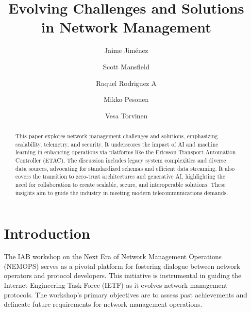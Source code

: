 \documentclass[11pt,sigconf]{iabart}
\begin{document}
\title{Evolving Challenges and Solutions in Network Management}

\author{Jaime Jiménez}

\author{Scott Mansfield}

\author{Raquel Rodriguez A}

\author{Mikko Pesonen}

\author{Vesa Torvinen}


\begin{abstract}

This paper explores network management challenges and solutions, emphasizing scalability, telemetry, and security. It underscores the impact of AI and machine learning in enhancing operations via platforms like the Ericsson Transport Automation Controller (ETAC). The discussion includes legacy system complexities and diverse data sources, advocating for standardized schemas and efficient data streaming. It also covers the transition to zero-trust architectures and generative AI, highlighting the need for collaboration to create scalable, secure, and interoperable solutions. These insights aim to guide the industry in meeting modern telecommunications demands.


\end{abstract}


\maketitle

\section{Introduction} \label{introduction}

The IAB workshop on the Next Era of Network Management Operations (NEMOPS) serves as a pivotal platform for fostering dialogue between network operators and protocol developers. This initiative is instrumental in guiding the Internet Engineering Task Force (IETF) as it evolves network management protocols. The workshop's primary objectives are to assess past achievements and delineate future requirements for network management operations.
\end{document}
